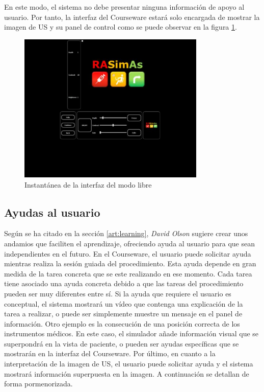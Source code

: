 En este modo, el sistema no debe presentar ninguna información de apoyo al usuario. Por tanto, la interfaz del \ac{Courseware} estará solo encargada de mostrar la imagen de \ac{US} y su panel de control como se puede observar en la figura \ref{fig:freeui}.

\begin{figure}[h]
    \centering
    \includegraphics[width=0.8\textwidth]{IMG/freeui.PNG}
    \caption{Instantánea de la interfaz del modo libre}
    \label{fig:freeui}
\end{figure}


 

\subsection{Ayudas al usuario}
\label{course:ayudas}

Según se ha citado en la sección \ref{art:learning}, \emph{David Olson} \cite{olson2014jerome} sugiere crear unos andamios que faciliten el aprendizaje, ofreciendo ayuda al usuario para que sean independientes en el futuro. En el \ac{Courseware}, el usuario puede solicitar ayuda mientras realiza la sesión guiada del procedimiento. Esta ayuda depende en gran medida de la tarea concreta que se este realizando en ese momento. Cada tarea tiene asociado una ayuda concreta debido a que las tareas del procedimiento pueden ser muy diferentes entre sí. Si la ayuda que requiere el usuario es conceptual, el sistema mostrará un vídeo que contenga una explicación de la tarea a realizar, o puede ser simplemente muestre un mensaje en el panel de información. Otro ejemplo es la consecución de una posición correcta de los instrumentos médicos. En este caso, el simulador añade información visual que se superpondrá en la vista de paciente, o pueden ser ayudas específicas que se mostrarán en la interfaz del \ac{Courseware}. Por último, en cuanto a la interpretación de la imagen de \ac{US}, el usuario puede solicitar ayuda y el sistema mostrará información superpuesta en la imagen. A continuación se detallan de forma pormenorizada.


